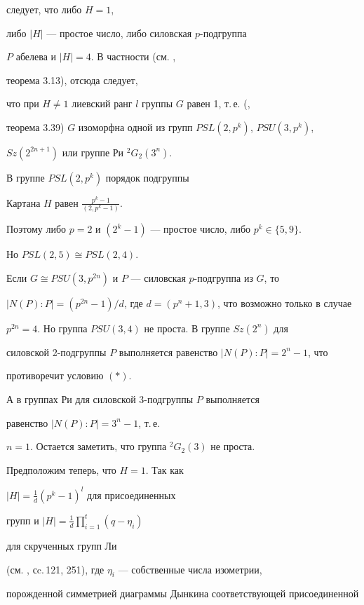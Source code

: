 следует, что либо $H=1$,


либо $|H|$ --- простое число, либо силовская $p$-подгруппа


$P$ абелева и $|H|=4$. В частности (см. \cite{gor},


теорема 3.13), отсюда следует,


что при $H\ne 1$ лиевский ранг $l$ группы $G$ равен 1, т.\,е. (\cite{gor},


теорема 3.39) $G$ изоморфна одной из групп $PSL(2,p^k)$, $PSU(3,p^k)$,


$Sz(2^{2n+1})$ или группе Ри $^2G_2(3^n)$.





В группе $PSL(2,p^k)$ порядок подгруппы 


Картана $H$ равен $\frac{p^k-1}{(2,p^k-1)}$.


Поэтому либо $p=2$ и $(2^k-1)$ --- простое число, либо $p^k\in\{5,9\}$.


Но $PSL(2,5)\cong PSL(2,4)$.





Если $G\cong PSU(3,p^{2n})$ и $P$ --- силовская $p$-подгруппа из $G$, то


$|N(P):P|=(p^{2n}-1)/d$, где $d=(p^n+1,3)$, что возможно только в случае


$p^{2n}=4$. Но группа $PSU(3,4)$ не проста. В группе $Sz(2^{n})$ для


силовской 2-подгруппы $P$ выполняется равенство $|N(P):P|=2^n-1$, что


противоречит условию $(\ast)$.


А в группах Ри для силовской 3-подгруппы $P$ выполняется


равенство $|N(P):P|=3^n-1$, т.\,е.


$n=1$. Остается заметить, что группа $^2G_2(3)$ не проста.





Предположим теперь, что $H=1$. Так как


$|H|=\frac{1}{d}(p^k-1)^l$ для присоединенных


групп и $|H|=\frac{1}{d}\prod\limits_{i=1}^t(q-\eta_i)$


для скрученных групп Ли


(см. \cite{cart}, сc.\,121, 251), где $\eta_i$ --- собственные числа изометрии,


порожденной симметрией диаграммы Дынкина соответствующей присоединенной


